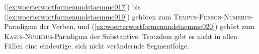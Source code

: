 \begin{exe}
  \ex \label{ex:woerterwortformenundstaemme017}
  \begin{xlist}
  \end{xlist}
  \ex \label{ex:woerterwortformenundstaemme018}
  \begin{xlist}
  \end{xlist}
  \ex \label{ex:woerterwortformenundstaemme019}
  \begin{xlist}
  \end{xlist}
  \ex \label{ex:woerterwortformenundstaemme020}
  \begin{xlist}
  \end{xlist}
\end{exe}

(\ref{ex:woerterwortformenundstaemme017}) bis (\ref{ex:woerterwortformenundstaemme019}) gehören zum \textsc{Tempus}-\textsc{Person}-\textsc{Numerus}-Paradigma der Verben, und (\ref{ex:woerterwortformenundstaemme020}) gehört zum \textsc{Kasus}-\textsc{Numerus}-Paradigma der Substantive.
Trotzdem gibt es nicht in allen Fällen eine eindeutige, sich nicht verändernde Segmentfolge.

